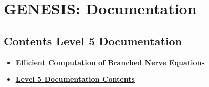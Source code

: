 \documentclass[12pt]{article}
\begin{document}
\section*{GENESIS: Documentation}

\subsection*{Contents Level 5 Documentation}

\begin{itemize}

\item \href{../effic84/effic84.pdf}{\bf \underline{Efficient Computation of Branched Nerve Equations}}

\item \href{../contents-level5/contents-level5.pdf}{\bf \underline{Level 5 Documentation Contents}}


\end{itemize}

\end{document}
